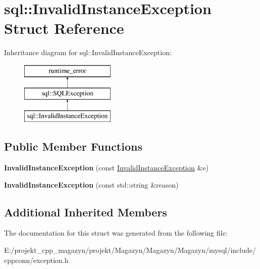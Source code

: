 \hypertarget{structsql_1_1_invalid_instance_exception}{}\section{sql\+:\+:Invalid\+Instance\+Exception Struct Reference}
\label{structsql_1_1_invalid_instance_exception}
Inheritance diagram for sql\+:\+:Invalid\+Instance\+Exception\+:\begin{figure}[H]
\begin{center}
\leavevmode
\includegraphics[height=3.000000cm]{structsql_1_1_invalid_instance_exception}
\end{center}
\end{figure}
\subsection*{Public Member Functions}
\begin{DoxyCompactItemize}
\item 
\hypertarget{structsql_1_1_invalid_instance_exception_ab05dca77f401255f0b4ec853251dfe1e}{}\label{structsql_1_1_invalid_instance_exception_ab05dca77f401255f0b4ec853251dfe1e} 
{\bfseries Invalid\+Instance\+Exception} (const \hyperlink{structsql_1_1_invalid_instance_exception}{Invalid\+Instance\+Exception} \&e)
\item 
\hypertarget{structsql_1_1_invalid_instance_exception_a37ad3895e8193a28d82fad885cfbdd89}{}\label{structsql_1_1_invalid_instance_exception_a37ad3895e8193a28d82fad885cfbdd89} 
{\bfseries Invalid\+Instance\+Exception} (const std\+::string \&reason)
\end{DoxyCompactItemize}
\subsection*{Additional Inherited Members}


The documentation for this struct was generated from the following file\+:\begin{DoxyCompactItemize}
\item 
E\+:/projekt\+\_\+cpp\+\_\+magazyn/projekt/\+Magazyn/\+Magazyn/\+Magazyn/mysql/include/cppconn/exception.\+h\end{DoxyCompactItemize}
